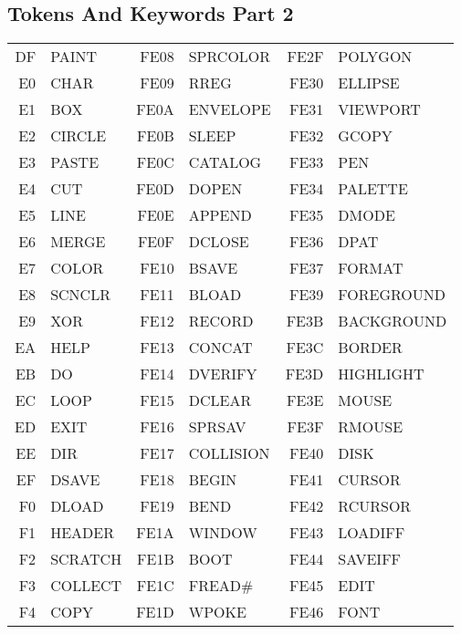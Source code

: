 \subsection{Tokens And Keywords Part 2}
{\ttfamily
\setlength{\tabcolsep}{1mm}
\begin{center}
\begin{tabular}{|rp{2.2cm}|rp{2.2cm}|rp{2.2cm}|}
\hline
  DF & PAINT      & FE08 & SPRCOLOR   & FE2F & POLYGON    \\
  E0 & CHAR       & FE09 & RREG       & FE30 & ELLIPSE    \\
  E1 & BOX        & FE0A & ENVELOPE   & FE31 & VIEWPORT   \\
  E2 & CIRCLE     & FE0B & SLEEP      & FE32 & GCOPY      \\
  E3 & PASTE      & FE0C & CATALOG    & FE33 & PEN        \\
  E4 & CUT        & FE0D & DOPEN      & FE34 & PALETTE    \\
  E5 & LINE       & FE0E & APPEND     & FE35 & DMODE      \\
  E6 & MERGE      & FE0F & DCLOSE     & FE36 & DPAT       \\
  E7 & COLOR      & FE10 & BSAVE      & FE37 & FORMAT     \\
  E8 & SCNCLR     & FE11 & BLOAD      & FE39 & FOREGROUND \\
  E9 & XOR        & FE12 & RECORD     & FE3B & BACKGROUND \\
  EA & HELP       & FE13 & CONCAT     & FE3C & BORDER     \\
  EB & DO         & FE14 & DVERIFY    & FE3D & HIGHLIGHT  \\
  EC & LOOP       & FE15 & DCLEAR     & FE3E & MOUSE      \\
  ED & EXIT       & FE16 & SPRSAV     & FE3F & RMOUSE     \\
  EE & DIR        & FE17 & COLLISION  & FE40 & DISK       \\
  EF & DSAVE      & FE18 & BEGIN      & FE41 & CURSOR     \\
  F0 & DLOAD      & FE19 & BEND       & FE42 & RCURSOR    \\
  F1 & HEADER     & FE1A & WINDOW     & FE43 & LOADIFF    \\
  F2 & SCRATCH    & FE1B & BOOT       & FE44 & SAVEIFF    \\
  F3 & COLLECT    & FE1C & FREAD\#    & FE45 & EDIT       \\
  F4 & COPY       & FE1D & WPOKE      & FE46 & FONT       \\

\end{tabular}
\end{center}}
